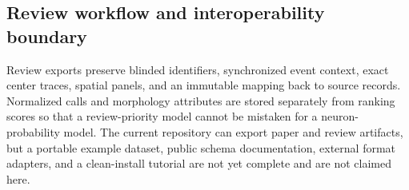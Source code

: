 \subsection{Review workflow and interoperability boundary}

Review exports preserve blinded identifiers, synchronized event context, exact
center traces, spatial panels, and an immutable mapping back to source records.
Normalized calls and morphology attributes are stored separately from ranking
scores so that a review-priority model cannot be mistaken for a neuron-probability
model. The current repository can export paper and review artifacts, but a
portable example dataset, public schema documentation, external format adapters,
and a clean-install tutorial are not yet complete and are not claimed here.
